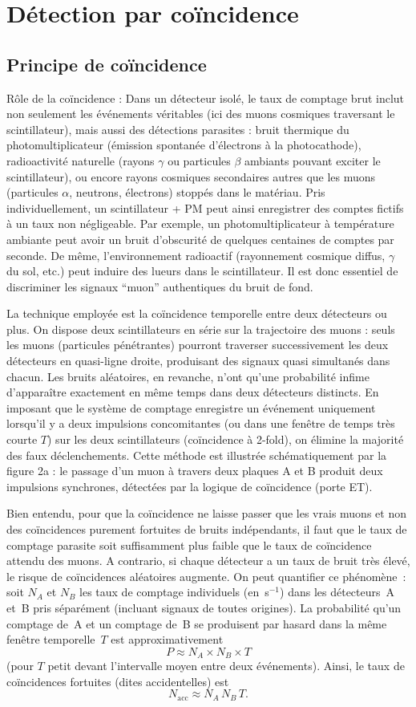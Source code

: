 \documentclass[a4paper,12pt,twoside]{article}
\begin{document}
\section{Détection par coïncidence}
\subsection{Principe de coïncidence}
Rôle de la coïncidence : Dans un détecteur isolé, le taux de comptage brut inclut non seulement les événements véritables (ici des muons cosmiques traversant le scintillateur), mais aussi des détections parasites : bruit thermique du photomultiplicateur (émission spontanée d’électrons à la photocathode), radioactivité naturelle (rayons $\gamma$ ou particules $\beta$ ambiants pouvant exciter le scintillateur), ou encore rayons cosmiques secondaires autres que les muons (particules $\alpha$, neutrons, électrons) stoppés dans le matériau. Pris individuellement, un scintillateur + PM peut ainsi enregistrer des comptes fictifs à un taux non négligeable. Par exemple, un photomultiplicateur à température ambiante peut avoir un bruit d’obscurité de quelques centaines de comptes par seconde. De même, l’environnement radioactif (rayonnement cosmique diffus, $\gamma$ du sol, etc.) peut induire des lueurs dans le scintillateur. Il est donc essentiel de discriminer les signaux “muon” authentiques du bruit de fond.

La technique employée est la coïncidence temporelle entre deux détecteurs ou plus. On dispose deux scintillateurs en série sur la trajectoire des muons : seuls les muons (particules pénétrantes) pourront traverser successivement les deux détecteurs en quasi-ligne droite, produisant des signaux quasi simultanés dans chacun. Les bruits aléatoires, en revanche, n’ont qu’une probabilité infime d’apparaître exactement en même temps dans deux détecteurs distincts. En imposant que le système de comptage enregistre un événement uniquement lorsqu’il y a deux impulsions concomitantes (ou dans une fenêtre de temps très courte $T$) sur les deux scintillateurs (coïncidence à 2-fold), on élimine la majorité des faux déclenchements. Cette méthode est illustrée schématiquement par la figure 2a : le passage d’un muon à travers deux plaques A et B produit deux impulsions synchrones, détectées par la logique de coïncidence (porte ET).

Bien entendu, pour que la coïncidence ne laisse passer que les \og vrais\fg{} muons et non des coïncidences purement fortuites de bruits indépendants, il faut que le taux de comptage parasite soit suffisamment plus faible que le taux de coïncidence attendu des muons. A contrario, si chaque détecteur a un taux de bruit très élevé, le risque de coïncidences aléatoires augmente. On peut quantifier ce phénomène~: soit $N_A$ et $N_B$ les taux de comptage individuels (en~s$^{-1}$) dans les détecteurs~A et~B pris séparément (incluant signaux de toutes origines). La probabilité qu’un comptage de~A et un comptage de~B se produisent par hasard dans la même fenêtre temporelle~$T$ est approximativement
\[
P \approx N_A \times N_B \times T
\]
(pour $T$ petit devant l’intervalle moyen entre deux événements). Ainsi, le taux de coïncidences fortuites (dites accidentelles) est
\[
N_{\mathrm{acc}} \approx N_A\,N_B\,T.
\]
\end{document}
